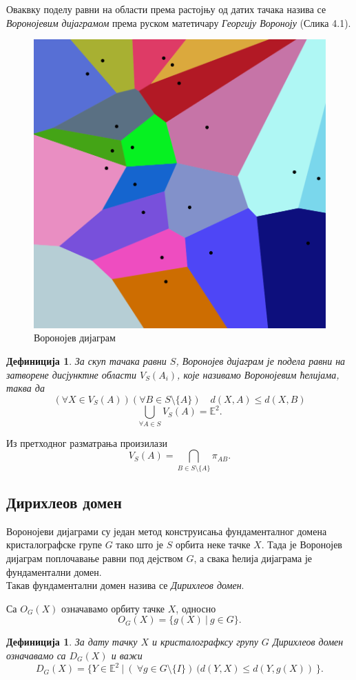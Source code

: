\documentclass[12pt]{article}
\newtheorem{definition}[theorem]{\bf Дефиниција}
\begin{document}
Оваквку поделу равни на области према растојњу од датих тачака назива се \emph{Воронојевим дијаграмом} према руском матетичару \emph{Георгију Вороноју} (Слика 4.1).

\begin{figure}[H]
    \centering
    \includegraphics[width=.4\textwidth]{voronoiiii.png}
    \caption{Воронојев дијаграм}
    \label{fig:my_label}
\end{figure}

\begin{definition}%
За скуп тачака равни $S$, Воронојев дијаграм је подела равни на затворене дисјунктне области $V_S(A_i)$, које називамо Воронојевим  ћелијама, таква да
$$ (\forall X \in V_{S}(A))(\forall B \in S\setminus \{A\})\quad d(X,A)\leq d(X,B) $$
$$ \bigcup_{\forall A \in S} V_{S}(A) = \mathbb{E}^2 .$$

\end{definition}

Из претходног разматрања произилази
$$V_S(A) = \bigcap _{B \in S \setminus \{A\}} \pi_{AB}.$$ 

\subsection{Дирихлеов домен}

Воронојеви дијаграми су један метод конструисања фундаменталног домена кристалографске групе $G$ тако што је $S$ орбита неке тачке $X$. Тада је Воронојев дијаграм поплочавање равни под дејством $G$, а свака ћелија дијаграма је фундаментални домен. \\
Такав фундаментални домен назива се \emph{Дирихлеов домен}.

Са $O_G(X)$ означавамо орбиту тачке $X$, односно
$$O_G(X) = \{g(X)\:|\:g \in G\} .$$

\begin{definition}
За дату тачку $X$ и кристалографксу групу $G$ Дирихлеов домен означавамо са $D_G(X)$ и важи
$$D_G(X) = \{Y \in \mathbb{E}^2\:|\:(\:\forall g \in G \setminus \{I\})\:(d(Y,X)\leq d(Y,g(X))\:\}.$$
\end{definition}
\end{document}
